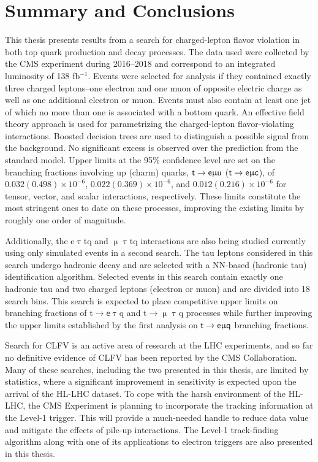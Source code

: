 \chapter{Summary and Conclusions}
\label{chap:Conclusion}

This thesis presents results from a search for charged-lepton flavor violation in both top quark production and decay processes. The data used were collected by the \ac{CMS} experiment during 2016--2018 and correspond to an integrated luminosity of 138 fb$^{-1}$. Events were selected for analysis if they contained exactly three charged leptons--one electron and one muon of opposite electric charge as well as one additional electron or muon. Events must also contain at least one jet of which no more than one is associated with a bottom quark. An effective field theory approach is used for parametrizing the charged-lepton flavor-violating interactions. Boosted decision trees are used to distinguish a possible signal from the background. No significant excess is observed over the prediction from the standard model. Upper limits at the 95\% confidence level are set on the branching fractions involving up (charm) quarks, $\textsf{t}\rightarrow\textsf{e}\upmu\textsf{u}$ ($\textsf{t}\rightarrow\textsf{e}\upmu\textsf{c}$), of $0.032 (0.498) \times 10^{-6}$, $0.022 (0.369) \times 10^{-6}$, and $0.012 (0.216) \times 10^{-6}$ for tensor, vector, and scalar interactions, respectively. These limits constitute the most stringent ones to date on these processes, improving the existing limits by roughly one order of magnitude.

Additionally, the e$\uptau$tq and $\upmu\uptau$tq interactions are also being studied currently using only simulated events in a second search. The tau leptons considered in this search undergo hadronic decay and are selected with a \ac{NN}-based (hadronic tau) identification algorithm. Selected events in this search contain exactly one hadronic tau and two charged leptons (electron or muon) and are divided into 18 search bins. This search is expected to place competitive upper limits on branching fractions of t$\rightarrow\textsf{e}\uptau$q and t$\rightarrow\upmu\uptau$q processes while further improving the upper limits established by the first analysis on $\textsf{t}\rightarrow\textsf{e}\upmu\textsf{q}$ branching fractions. 

Search for \ac{CLFV} is an active area of research at the \ac{LHC} experiments, and so far no definitive evidence of \ac{CLFV} has been reported by the \ac{CMS} Collaboration. Many of these searches, including the two presented in this thesis, are limited by statistics, where a significant improvement in sensitivity is expected upon the arrival of the \ac{HL-LHC} dataset. To cope with the harsh environment of the \ac{HL-LHC}, the \ac{CMS} Experiment is planning to incorporate the tracking information at the Level-1 trigger. This will provide a much-needed handle to reduce data value and mitigate the effects of pile-up interactions. The Level-1 track-finding algorithm along with one of its applications to electron triggers are also presented in this thesis.